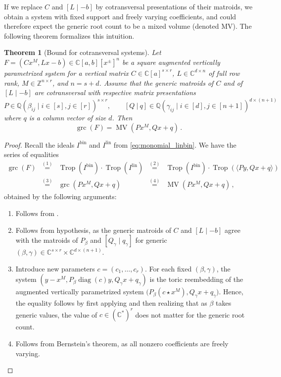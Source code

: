 \documentclass[11pt,reqno,a4paper]{amsart}
\numberwithin{equation}{section}
\theoremstyle{theoremstyle}
\newtheorem{theorem}{Theorem}[section]
\theoremstyle{examplestyle}
\newcommand{\CC}{\mathbb{C}}
\newcommand{\QQ}{\mathbb{Q}}
\newcommand{\lin}{{\mathrm{lin}}}
\newcommand{\bin}{{\mathrm{bin}}}
\DeclareMathOperator{\grc}{grc}
\DeclareMathOperator{\diag}{diag}
\DeclareMathOperator{\MV}{MV}
\DeclareMathOperator{\Trop}{Trop}
\begin{document}
If we replace $C$ and $[L\mid -b]$ by cotransversal presentations of their matroids, we obtain a system with fixed support and freely varying coefficients, and could therefore expect the generic root count to be a mixed volume (denoted MV). The following theorem formalizes this intuition.
 

\begin{theorem}[Bound for cotransversal systems]
\label{thm:cotransversal}
    Let $F=(C  x^M  ,Lx-b)\in \CC[a,b][x^\pm]^n$  be a square augmented vertically parametrized system  for a vertical matrix $C\in \CC[a]^{s\times r}$, $L\in \mathbb{C}^{d\times n}$ of full row rank,  $M\in \mathbb{Z}^{n\times r}$, and $n=s+d$. 
    Assume that the generic matroids of $C$ and of $[L \mid -b]$ are cotransversal with respective matrix presentations
    \[ P \in \QQ(\beta_{ij} \mid i\in [s],j\in[r])^{s\times r}, \qquad 
    [Q\ |\  q] \in \QQ(\gamma_{ij} \mid i\in [d],j\in[n+1])^{d\times (n+1)} \,   \]
    where $q$ is a column vector of size $d$. 
    Then
    \[\grc(F) = \MV(P x^M , Q x + q)\,.\]
\end{theorem}
\begin{proof}
Recall the ideals $I^{\bin}$ and $I^{\lin}$ from \eqref{eq:monomial_linbin}. 
We have the series of equalities
\begin{equation*}
    \begin{array}{rclcl}
   \grc(F) 
      &\overset{(1)}{=}&  \Trop(I^{\bin}) \cdot \Trop(I^{\lin})  
      &\overset{(2)}{=}&   \Trop(I^{\bin})  \cdot \Trop( \langle 
      P  y , Q  x + q   \rangle )
      \\ 
          &\overset{(3)}{=}& \grc( P x^M , Q  x + q) %
      &\overset{(4)}{=}& \MV(P x^M , Q  x + q) \, ,
    \end{array}
  \end{equation*}
obtained by the following arguments: 
  \begin{enumerate}
  \item Follows from . 
  \item Follows from hypothesis, as the generic matroids of $C$ and $[L\mid-b]$ agree with the matroids of $P_\beta$ and $[Q_\gamma\mid q_\gamma]$ for generic $(\beta,\gamma) \in \CC^{s\times r}\times\CC^{d\times (n+1)}$.
   
    \item Introduce new parameters $c=(c_1,\ldots,c_r)$. For each fixed $(\beta,\gamma)$, the system $(y-x^M, P_\beta \diag(c) y, Q_\gamma  x + q_\gamma)$ is the toric reembedding of the augmented vertically parametrized system  $\big( P_\beta(c\star x^M), Q_\gamma  x + q_\gamma  \big)$. 
    Hence, the equality follows by first applying  and then realizing that as $\beta$ takes generic values, 
    the value of $c\in (\CC^*)^r$ does not matter for the generic root count. 
\item Follows from Bernstein's theorem, as all nonzero coefficients are freely varying. \qedhere
\end{enumerate}  
\end{proof}
\end{document}
